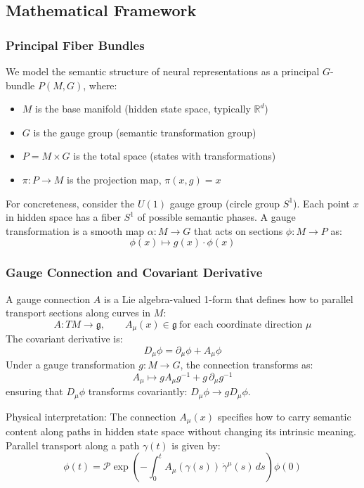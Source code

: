 \documentclass{article}
\numberwithin{equation}{section}
\begin{document}
\subsection{Mathematical Framework}
\subsubsection{Principal Fiber Bundles}
We model the semantic structure of neural representations as a principal $G$-bundle $P(M, G)$, where:
\begin{itemize}
\item $M$ is the base manifold (hidden state space, typically $\mathbb{R}^d$)
\item $G$ is the gauge group (semantic transformation group)
\item $P = M \times G$ is the total space (states with transformations)
\item $\pi: P \to M$ is the projection map, $\pi(x, g) = x$
\end{itemize}
For concreteness, consider the $U(1)$ gauge group (circle group $S^1$). Each point $x$ in hidden space has a fiber $S^1$ of possible semantic phases. A gauge transformation is a smooth map $\alpha: M \to G$ that acts on sections $\phi: M \to P$ as:
\[
\phi(x) \mapsto g(x)\cdot \phi(x)
\]

\subsubsection{Gauge Connection and Covariant Derivative}
A gauge connection $A$ is a Lie algebra-valued 1-form that defines how to parallel transport sections along curves in $M$:
\[
A: TM \to \mathfrak{g},\qquad A_\mu(x) \in \mathfrak{g}\ \text{for each coordinate direction }\mu
\]
The covariant derivative is:
\[
D_\mu \phi = \partial_\mu \phi + A_\mu \phi
\]
Under a gauge transformation $g: M \to G$, the connection transforms as:
\[
A_\mu \mapsto g A_\mu g^{-1} + g\,\partial_\mu g^{-1}
\]
ensuring that $D_\mu \phi$ transforms covariantly: $D_\mu \phi \to g D_\mu \phi$.

Physical interpretation: The connection $A_\mu(x)$ specifies how to carry semantic content along paths in hidden state space without changing its intrinsic meaning. Parallel transport along a path $\gamma(t)$ is given by:
\[
\phi(t) = \mathcal{P}\exp\left(-\int_0^t A_\mu(\gamma(s))\,\dot{\gamma}^\mu(s)\,ds\right)\phi(0)
\]
\end{document}
